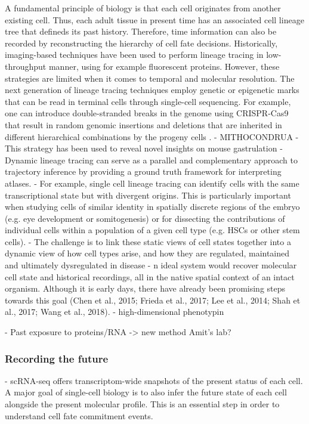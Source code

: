 A fundamental principle of biology is that each cell originates from another existing cell. Thus, each adult tissue in present time has an associated cell lineage tree that defineds its past history. Therefore, time information can also be recorded by reconstructing the hierarchy of cell fate decisions. Historically, imaging-based techniques have been used to perform lineage tracing in low-throughput manner, using for example fluorescent proteins. However, these strategies are limited when it comes to temporal and molecular resolution.
The next generation of lineage tracing techniques employ genetic or epigenetic marks that can be read in terminal cells through single-cell sequencing. For example, one can introduce double-stranded breaks in the genome using CRISPR-Cas9 that result in random genomic insertions and deletions that are inherited in different hierarchical combinations by the progeny cells \cite{XX}. 
- MITHOCONDRUA
- This strategy has been used to reveal novel insights on mouse gastrulation
- Dynamic lineage tracing can serve as a parallel and complementary approach to trajectory inference by providing a ground truth framework for interpreting atlases.
- For example, single cell lineage tracing can identify cells with the same transcriptional state but with divergent origins.  This is particularly important when studying cells of similar identity in spatially discrete regions of the embryo (e.g. eye development or somitogenesis) or for dissecting the contributions of individual cells within a population of a given cell type (e.g. HSCs or other stem cells). 
- The challenge is to link these static views of cell states together into a dynamic view of how cell types arise, and how they are regulated, maintained and ultimately dysregulated in disease 
- n ideal system would recover molecular cell state and historical recordings, all in the native spatial context of an intact organism. Although it is early days, there have already been promising steps towards this goal (Chen et al., 2015; Frieda et al., 2017; Lee et al., 2014; Shah et al., 2017; Wang et al., 2018).
-  high-dimensional phenotypin




- Past exposure to proteins/RNA -> new method Amit's lab?


\subsubsection{Recording the future} 

- scRNA-seq offers transcriptom-wide snapshots of the present status of each cell. A major goal of single-cell biology is to also infer the future state of each cell alongside the present molecular profile. This is an essential step in order to understand cell fate commitment events. 

